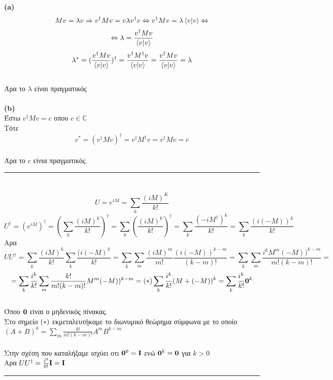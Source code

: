 \documentclass[12pt]{article}
\begin{document}
\section*{{}}
{\bf { (\textlatin{a})}}
$$Mv=\lambda v \Rightarrow v^\dag Mv=v\lambda v^\dag v \Leftrightarrow v^\dag Mv =\lambda \braket{v|v} \Leftrightarrow $$
$$\Leftrightarrow \lambda = \frac{ v^\dag Mv}{ \braket{v|v}} $$
$$\lambda^* = (\frac{ v^\dag Mv}{ \braket{v|v}})^\dag = \frac{ v^\dag M^\dag v}{ \braket{v|v}}=\frac{ v^\dag Mv}{ \braket{v|v}} = \lambda $$\\
Άρα το $\lambda$ είναι πραγματικός\\ \\
{\bf { (\textlatin{b})}}\\
Έστω $v^\dag M v = c$ οπου $c \in \mathbb{C}$\\
Τότε $$ c^* = (v^\dag M v)^\dag = v^\dag M^\dag v = v^\dag M v = c$$\\
Άρα το $c$ είνια πραγματικός.\\
\rule{\textwidth}{.5pt}

\section*{{}}

$$ U = e^{iM}=\sum_k \frac{(iM)^K}{k!}$$
$$ U^\dag=(e^{iM})^\dag=(\sum_k \frac{(iM)^k}{k!})^\dag=\sum_k (\frac{(iM)^k}{k!})^\dag=\sum_k \frac{(-iM^\dag)^k}{k!}=\sum_k \frac{(i(-M))^k}{k!}$$
Αρα  
$$ UU^\dag = \sum_k \frac{(iM)^k}{k!}\sum_k \frac{(i(-M)^k}{k!}=
 \sum_k  \sum_m \frac{(iM)^m}{m!}\frac{(i(-M))^{k-m}}{(k-m)!}=
 \sum_k  \sum_m \frac{i^k M^m(-M))^{k-m}}{m!(k-m)!}=$$
 $$= \sum_k \frac{i^k}{k!} \sum_m \frac{k!}{m!(k-m)!}M^m(-M))^{k-m} ={\bf (\bf*)} \sum_k \frac{i^k}{k!} (M + (-M))^k =\sum_k \frac{i^k}{k!} {\bf 0}^k$$\\ 
Όπου ${\bf 0}$ είναι ο μηδενικός πίνακας.\\
 Στο σημείο ${\bf (*)}$ εκμεταλευτήκαμε το διωνυμικό θεώρημα σύμφωνα με το οποίο $(A+B)^k=\sum_m  \frac{k!}{m!(k-m)!}A^mB^{k-m}$  \\ \\
Στην σχέση που καταλήξαμε ισχύει οτι ${\bf 0}^0 ={\bf I}$ ενώ ${\bf 0}^k ={\bf 0}$ για $k>0$\\
Αρα $UU^\dag = \frac{i^0}{0!}{\bf I}= {\bf I}$\\
\rule{\textwidth}{.5pt}
\end{document}
